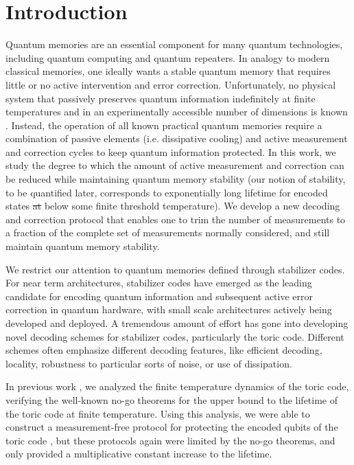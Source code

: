\documentclass[twocolumn,superscriptaddress,aps,prb,floatfix]{revtex4-1}
\newcommand{\MS}[1]{{\color{mauve} {#1}}}
\begin{document}
\section{Introduction}
\label{sec:Intro}
 Quantum memories are an essential component for many quantum technologies, including quantum computing and quantum repeaters. In analogy to modern classical memories, one ideally wants a stable quantum memory that requires little or no active intervention and error correction. Unfortunately, no physical system that passively preserves quantum information indefinitely at finite temperatures and in an experimentally accessible number of dimensions is known \cite{Terhal:2015ks}. Instead, the operation of all known practical quantum memories require a combination of passive elements (i.e. dissipative cooling) and active measurement and correction cycles to keep quantum information protected.  In this work, we study the degree to which the amount of active measurement and correction can be reduced while maintaining quantum memory stability (our notion of stability, to be quantified later, corresponds to exponentially long lifetime for encoded states \MS{\sout{at} below} some finite threshold temperature). We develop a new decoding and correction protocol that enables one to trim the number of measurements to a fraction of the complete set of measurements normally considered, and still maintain quantum memory stability. 
 
 We restrict our attention to quantum memories defined through stabilizer codes. For near term architectures, stabilizer codes\cite{Gottesman98} have emerged as the leading candidate for encoding quantum information and subsequent active error correction in quantum hardware, with small scale architectures actively being developed and deployed\cite{all the stabilizers}.  A tremendous amount of effort has gone into developing novel decoding schemes for stabilizer codes, particularly the toric code.  Different schemes often emphasize different decoding features, like efficient decoding\cite{Kovalev2013,Wang2009,Duclos-Cianci2010}, locality\cite{Breuckmann2016,Torlai2016,Harrington2004,Herold2014}, robustness to particular sorts of noise\cite{Novais2013,Bombin2012,Wootton2015}, or use of dissipation\cite{Freeman2016,Hutter2012a,Hutter2014,Fujii2014,Pedrocchi2013,Pedrocchi2011,Chesi2010a,Chesi2010b,Hamma2009,Herdman2010, Young2012,Weimer2010, Dengis2014, Kapit2015, Bardyn2015}.
 
 In previous work \cite{Freeman2014}, we analyzed the finite temperature dynamics of the toric code, verifying the well-known no-go theorems for the upper bound to the lifetime of the toric code at finite temperature\cite{Bravyi2009, Alicki2009a, Chesi2010b, Yoshida2011b, Hastings2011a, Landon-Cardinal2013, Temme2014, temme2015fast}.  Using this analysis, we were able to construct a measurement-free protocol for protecting the encoded qubits of the toric code \cite{Freeman2016}, but these protocols again were limited by the no-go theorems, and only provided a multiplicative constant increase to the lifetime.  
 
\end{document}
